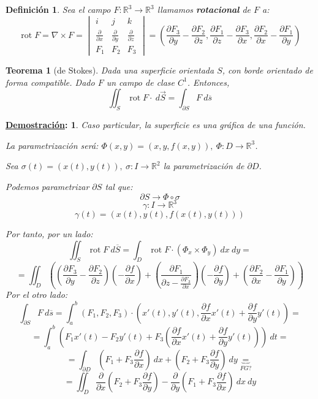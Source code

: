 \documentclass[10pt,a4paper,openright]{book}
\theoremstyle{break}
\newtheorem*{defi}{Definición}
\newtheorem*{theo}{Teorema}
\newtheorem*{demo}{\underline{Demostración}:}
\DeclareMathOperator{\rot}{rot}
\newcommand{\dif}[1]{\ d#1}
\begin{document}
\begin{defi}
Sea el campo $F: \mathbb{R}^3 \rightarrow \mathbb{R}^3$ llamamos \textbf{rotacional} de $F$ a: 
$$\rot F = \nabla \times F = \begin{vmatrix} i & j & k\\
\frac{\partial}{\partial x} & \frac{\partial }{\partial y} & \frac{\partial }{\partial z} \\
F_1 & F_2 & F_3\end{vmatrix} = \left( \frac{\partial F_3}{\partial y} - \frac{\partial F_2}{\partial z}, \frac{\partial F_1}{\partial z} - \frac{\partial F_3}{\partial x}, \frac{\partial F_2}{\partial x} - \frac{\partial F_1}{\partial y} \right)$$
\end{defi}

\begin{theo}[de Stokes]
Dada una superficie orientada $S$, con borde orientado de forma compatible. Dado $F$ un campo de clase $C^1$. Entonces, 
$$\iint_{S} \rot F \cdot \dif{\vec{S}} = \int_{\partial S} F \dif{\overline{s}}$$
\end{theo}
\begin{demo}
Caso particular, la superficie es una gráfica de una función.

La parametrización será: $\Phi\left( x, y \right) = \left( x, y, f\left( x, y \right) \right),\ \Phi: D \rightarrow \mathbb{R}^3$.

Sea $\sigma\left( t \right) = \left( x\left( t \right), y\left( t \right) \right),\ \sigma: I \rightarrow \mathbb{R}^2$ la parametrización de $\partial D$. 

Podemos parametrizar $\partial S$ tal que: 
$$\partial S \rightarrow \Phi \circ \sigma$$
$$\gamma: I \rightarrow \mathbb{R}^3$$
$$\gamma\left( t \right) = \left( x\left( t \right), y\left( t \right), f\left( x\left( t \right), y\left( t \right) \right) \right)$$

Por tanto, por un lado:
$$\iint_{S} \rot F \dif{\overline{S}} = \int_{D} \rot F \cdot \left( \Phi_x \times \Phi_y \right) \dif{x} \dif{y} =$$
$$= \iint_{D} \left( \left( \frac{\partial F_3}{\partial y} - \frac{\partial F_2}{\partial z} \right) \left( -\frac{\partial f}{\partial x} \right) + \left( \frac{\partial F_1}{\partial z - \frac{\partial F_3}{\partial x}} \right) \left( -\frac{\partial f}{\partial y} \right) + \left( \frac{\partial F_2}{\partial x} - \frac{\partial F_1}{\partial y} \right) \right)$$
Por el otro lado: 
$$\int_{\partial S} F \dif{\overline{s}} = \int_{a}^{b} \left( F_1, F_2, F_3 \right) \cdot \left( x'\left( t \right), y'\left( t \right), \frac{\partial f}{\partial x} x'\left( t \right) + \frac{\partial f}{\partial y} y'\left( t \right) \right) = $$
$$= \int_{a}^{b} \left( F_1x'\left( t \right) - F_2y'\left( t \right) + F_3\left( \frac{\partial f}{\partial x} x'\left( t \right) + \frac{\partial f}{\partial y} y'\left( t \right) \right) \right) \dif{t} = $$
$$= \int_{\partial D} \left( F_1 + F_3 \frac{\partial f}{\partial x} \right) \dif{x} + \left( F_2 + F_3 \frac{\partial f}{\partial y} \right) \dif{y} \underbrace{=}_{FG?}$$
$$= \iint_{D} \frac{\partial}{\partial x} \left( F_2 + F_3 \frac{\partial f}{\partial y} \right) - \frac{\partial}{\partial y} \left( F_1 + F_3 \frac{\partial f}{\partial x} \right) \dif{x} \dif{y}$$
\end{demo}
\end{document}
